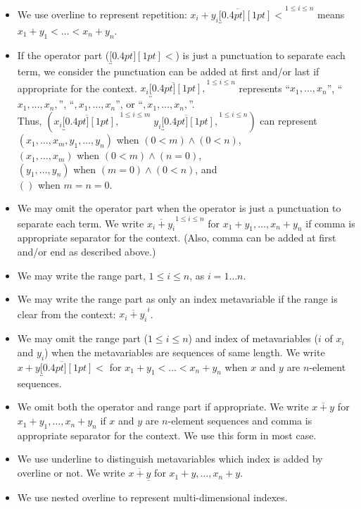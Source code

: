 \documentclass[a4paper,fleqn]{article}
\newcommand{\rep}[1]{\overline{#1}}
\newcommand{\repop}[2]{\overline{#1\underbracket[0.4pt][1pt]{#2}}}
\newcommand{\repopi}[3]{\overline{#1\underbracket[0.4pt][1pt]{#2}}^{#3}}
\newcommand{\repi}[2]{\overline{#1}^{#2}}
\begin{document}
\begin{itemize}
  \item We use overline to represent repetition:
    $\repopi{x_i+y_i}{<}{1\leq i \leq n}$ means $x_1+y_1 < \ldots < x_n+y_n$.
  \item If the operator part ($\underbracket[0.4pt][1pt]{<}$) is just a punctuation to separate each term,
    we consider the punctuation can be added at first and/or last if appropriate for the context.
    $\repopi{x_i}{,}{1\leq i \leq n}$ represents
    ``$x_1,\ldots ,x_n$'',
    ``$x_1,\ldots ,x_n,$'',
    ``$,x_1,\ldots ,x_n$'', or
    ``$,x_1,\ldots ,x_n,$''. \\
    Thus, $(\repopi{x_i}{,}{1\leq i \leq m}\;\repopi{y_i}{,}{1\leq i \leq n})$ can represent \\
    $(x_1,\ldots, x_m, y_1,\ldots, y_n)$ when $(0<m) \wedge (0<n)$, \\
    $(x_1,\ldots, x_m)$ when $(0<m)\wedge(n=0)$, \\
    $(y_1,\ldots, y_n)$ when $(m=0)\wedge(0<n)$, and \\
    $()$ when $m=n=0$.
  \item We may omit the operator part when the operator is just a punctuation to separate each term.
    We write $\repi{x_i+y_i}{1\leq i \leq n}$ for $x_1+y_1, \ldots, x_n+y_n$ if comma is appropriate separator for the context.
    (Also, comma can be added at first and/or end as described above.)
  \item We may write the range part, $1\leq i \leq n$, as $i=1\ldots n$.
  \item We may write the range part as only an index metavariable if the range is clear from the context: $\repi{x_i+y_i}{i}$.
  \item We may omit the range part ($1\leq i \leq n$) and index of metavariables ($i$ of $x_i$ and $y_i$) when the metavariables are sequences of same length.
    We write $\repop{x+y}{<}$ for $x_1+y_1 < \ldots < x_n+y_n$ when $x$ and $y$ are $n$-element sequences.
  \item We omit both the operator and range part if appropriate.
    We write $\rep{x+y}$ for $x_1+y_1, \ldots, x_n+y_n$ if $x$ and $y$ are $n$-element sequences and comma is appropriate separator for the context.
    We use this form in most case.
  \item We use underline to distinguish metavariables which index is added by overline or not.
    We write $\rep{x+\underline{y}}$ for $x_1+y, \ldots, x_n+y$.
  \item We use nested overline to represent multi-dimensional indexes. \\

\end{itemize}
\end{document}
